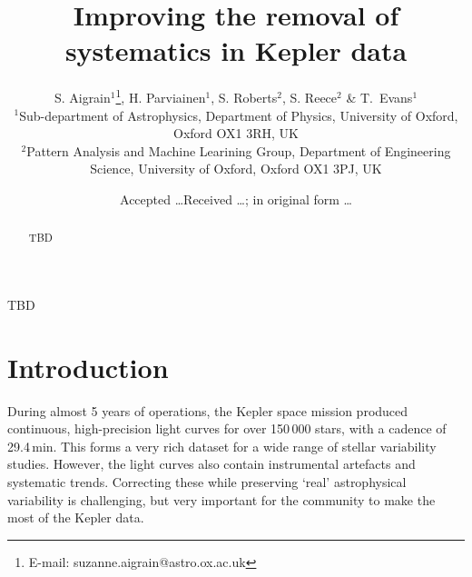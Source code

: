 \documentclass[useAMS,usenatbib]{mn2e}
\title{Improving the removal of systematics in Kepler data}
\author[S. Aigrain et al.]{S. Aigrain$^{1}$\thanks{E-mail:
    suzanne.aigrain@astro.ox.ac.uk}, H. Parviainen$^{1}$,
  S. Roberts$^{2}$, S. Reece$^{2}$ \& 
  T.\ Evans$^{1}$ \\
  $^{1}$Sub-department of Astrophysics, Department of Physics,
  University of Oxford, Oxford OX1 3RH, UK\\
  $^{2}$Pattern Analysis and Machine Learining Group, Department of
  Engineering Science, University of Oxford, Oxford OX1 3PJ, UK}
\begin{document}
\date{Accepted \ldots Received \ldots; in original form \ldots}

\pagerange{\pageref{firstpage}--\pageref{lastpage}} 

\maketitle

\label{firstpage}

\begin{abstract}
TBD
\end{abstract}

\begin{keywords}
TBD
\end{keywords}

\section{Introduction}

During almost 5 years of operations, the Kepler space mission produced
continuous, high-precision light curves for over 150\,000 stars, with
a cadence of 29.4\,min. This forms a very rich dataset for a wide
range of stellar variability studies. However, the light curves also
contain instrumental artefacts and systematic trends. Correcting these while
preserving `real' astrophysical variability is challenging, but very
important for the community to make the most of the Kepler
data. 
\end{document}
